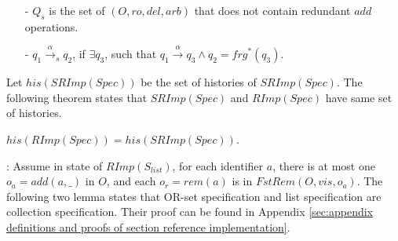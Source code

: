 \begin{itemize}
\setlength{\itemsep}{0.5pt}
\item[-] $Q_s$ is the set of $(O,\mathit{ro},\mathit{del},\mathit{arb})$ that does not contain redundant $\mathit{add}$ operations. %
\item[-] $q_1 {\xrightarrow{\alpha}}_s q_2$, if $\exists q_3$, such that $q_1 {\xrightarrow{\alpha}} q_3 \wedge q_2 = \mathit{frg}^*(q_3)$. %


\end{itemize} 




{\color {red}Let $\mathit{his}(\mathit{SRImp}(\mathit{Spec}))$ be the set of histories of $\mathit{SRImp}(\mathit{Spec})$.} The following theorem states that $\mathit{SRImp}(\mathit{Spec})$ and $\mathit{RImp}(\mathit{Spec})$ have same set of histories. 
\begin{theorem}
\label{theorem:SRIMPSpec and RIMPSpec have same history}
$\mathit{his}(\mathit{RImp}(\mathit{Spec})) = \mathit{his}(\mathit{SRImp}(\mathit{Spec}))$. 
\end{theorem}

: {\color {red}Assume in state of $\mathit{RImp}(S_{\mathit{list}})$, for each identifier $a$, there is at most one $o_a = \mathit{add}(a,\_)$ in $O$, and each $o_r = \mathit{rem}(a)$ is in $\mathit{FstRem}(O,\mathit{vis},o_a)$. The following two lemma states that OR-set specification and list specification are collection specification. Their proof can be found in Appendix \ref{sec:appendix definitions and proofs of section reference implementation}.}



